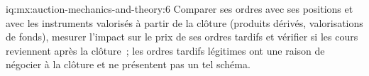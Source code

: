 \begin{solution}{iq:mx:auction-mechanics-and-theory:6}
Comparer ses ordres avec ses positions et avec les instruments valorisés à partir de la clôture (produits dérivés, valorisations de fonds), mesurer l'impact sur le prix de ses
ordres tardifs et vérifier si les cours reviennent après la clôture~; les ordres tardifs légitimes ont une raison de négocier à la clôture et ne présentent pas un tel schéma.
\end{solution}
